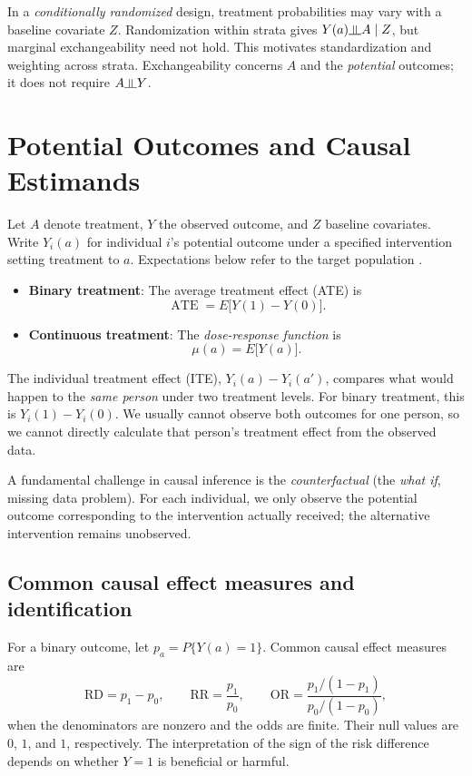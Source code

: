 \documentclass[11pt,twoside]{article}
\begin{document}
In a \emph{conditionally randomized} design, treatment probabilities may vary with a baseline covariate $Z$. Randomization within strata gives $Y(a)\indep A\mid Z$, but marginal exchangeability need not hold. This motivates standardization and weighting across strata. Exchangeability concerns $A$ and the \emph{potential} outcomes; it does not require $A\indep Y$.

\section{Potential Outcomes and Causal Estimands}
\label{sec:potential-outcomes}

Let $A$ denote treatment, $Y$ the observed outcome, and $Z$ baseline covariates. Write $Y_i(a)$ for individual $i$'s potential outcome under a specified intervention setting treatment to $a$. Expectations below refer to the target population \cite{Rubin1974EstimatingCE}.
\begin{itemize}
    \item \textbf{Binary treatment}: The average treatment effect (ATE) is
    \begin{equation}
    \label{eq:ate}
        \operatorname{ATE} = E\big[Y(1)-Y(0)\big].
    \end{equation}
    \item \textbf{Continuous treatment}: The \emph{dose-response function} is
    \begin{equation}
    \label{eq:dose-response}
        \mu(a) = E\big[Y(a)\big].
    \end{equation}
\end{itemize}

\begin{remark}
The individual treatment effect (ITE), $Y_i(a)-Y_i(a')$, compares what would happen to the \emph{same person} under two treatment levels. For binary treatment, this is $Y_i(1)-Y_i(0)$. We usually cannot observe both outcomes for one person, so we cannot directly calculate that person's treatment effect from the observed data.
\end{remark}

A fundamental challenge in causal inference is the \emph{counterfactual} (the \emph{what if}, missing data problem). For each individual, we only observe the potential outcome corresponding to the intervention actually received; the alternative intervention remains unobserved.


\subsection{Common causal effect measures and identification}
For a binary outcome, let $p_a=P\{Y(a)=1\}$. Common causal effect measures are
\[
 \mathrm{RD}=p_1-p_0,\qquad
 \mathrm{RR}=\frac{p_1}{p_0},\qquad
 \mathrm{OR}=\frac{p_1/(1-p_1)}{p_0/(1-p_0)},
\]
when the denominators are nonzero and the odds are finite. Their null values are $0$, $1$, and $1$, respectively. The interpretation of the sign of the risk difference depends on whether $Y=1$ is beneficial or harmful.
\end{document}
